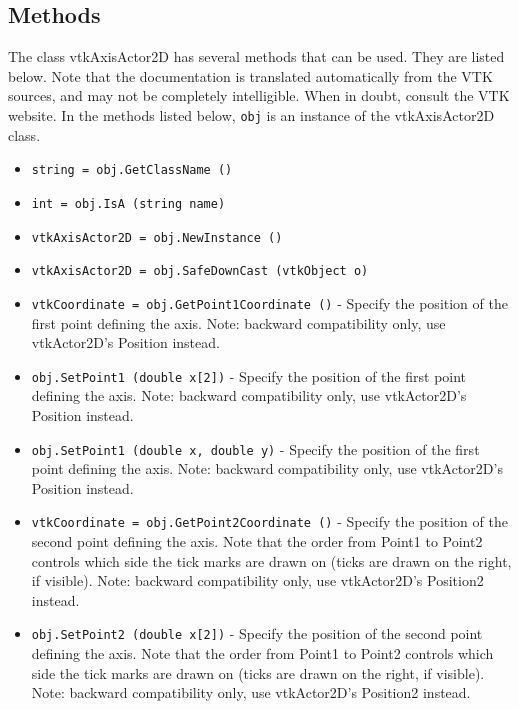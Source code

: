 \subsection{Methods}

The class vtkAxisActor2D has several methods that can be used.
  They are listed below.
Note that the documentation is translated automatically from the VTK sources,
and may not be completely intelligible.  When in doubt, consult the VTK website.
In the methods listed below, \verb|obj| is an instance of the vtkAxisActor2D class.
\begin{itemize}
\item  \verb|string = obj.GetClassName ()|

\item  \verb|int = obj.IsA (string name)|

\item  \verb|vtkAxisActor2D = obj.NewInstance ()|

\item  \verb|vtkAxisActor2D = obj.SafeDownCast (vtkObject o)|

\item  \verb|vtkCoordinate = obj.GetPoint1Coordinate ()| -  Specify the position of the first point defining the axis.
 Note: backward compatibility only, use vtkActor2D's Position instead.

\item  \verb|obj.SetPoint1 (double x[2])| -  Specify the position of the first point defining the axis.
 Note: backward compatibility only, use vtkActor2D's Position instead.

\item  \verb|obj.SetPoint1 (double x, double y)| -  Specify the position of the first point defining the axis.
 Note: backward compatibility only, use vtkActor2D's Position instead.

\item  \verb|vtkCoordinate = obj.GetPoint2Coordinate ()| -  Specify the position of the second point defining the axis. Note that
 the order from Point1 to Point2 controls which side the tick marks
 are drawn on (ticks are drawn on the right, if visible).
 Note: backward compatibility only, use vtkActor2D's Position2 instead.

\item  \verb|obj.SetPoint2 (double x[2])| -  Specify the position of the second point defining the axis. Note that
 the order from Point1 to Point2 controls which side the tick marks
 are drawn on (ticks are drawn on the right, if visible).
 Note: backward compatibility only, use vtkActor2D's Position2 instead.


\end{itemize}
